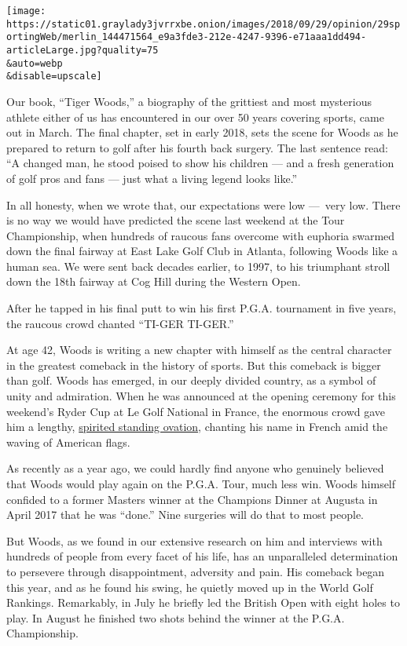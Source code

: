 \texttt{[image: https://static01.graylady3jvrrxbe.onion/images/2018/09/29/opinion/29sportingWeb/merlin\_144471564\_e9a3fde3-212e-4247-9396-e71aaa1dd494-articleLarge.jpg?quality=75\\\&auto=webp\\\&disable=upscale]}

Our book, ``Tiger Woods,'' a biography of the grittiest and most
mysterious athlete either of us has encountered in our over 50 years
covering sports, came out in March. The final chapter, set in early
2018, sets the scene for Woods as he prepared to return to golf after
his fourth back surgery. The last sentence read: ``A changed man, he
stood poised to show his children --- and a fresh generation of golf
pros and fans --- just what a living legend looks like.''

In all honesty, when we wrote that, our expectations were low ---~very
low. There is no way we would have predicted the scene last weekend at
the Tour Championship, when hundreds of raucous fans overcome with
euphoria swarmed down the final fairway at East Lake Golf Club in
Atlanta, following Woods like a human sea. We were sent back decades
earlier, to 1997, to his triumphant stroll down the 18th fairway at Cog
Hill during the Western Open.

After he tapped in his final putt to win his first P.G.A. tournament in
five years, the raucous crowd chanted ``TI-GER TI-GER.''

At age 42, Woods is writing a new chapter with himself as the central
character in the greatest comeback in the history of sports. But this
comeback is bigger than golf. Woods has emerged, in our deeply divided
country, as a symbol of unity and admiration. When he was announced at
the opening ceremony for this weekend's Ryder Cup at Le Golf National in
France, the enormous crowd gave him a lengthy,
\href{https://www.golfdigest.com/story/ryder-cup-2018-watch-tiger-woods-get-a-long-standing-ovation-at-ryder-cup-opening-ceremony}{spirited
standing ovation}, chanting his name in French amid the waving of
American flags.

As recently as a year ago, we could hardly find anyone who genuinely
believed that Woods would play again on the P.G.A. Tour, much less win.
Woods himself confided to a former Masters winner at the Champions
Dinner at Augusta in April 2017 that he was ``done.'' Nine surgeries
will do that to most people.

But Woods, as we found in our extensive research on him and interviews
with hundreds of people from every facet of his life, has an
unparalleled determination to persevere through disappointment,
adversity and pain. His comeback began this year, and as he found his
swing, he quietly moved up in the World Golf Rankings. Remarkably, in
July he briefly led the British Open with eight holes to play. In August
he finished two shots behind the winner at the P.G.A. Championship.

